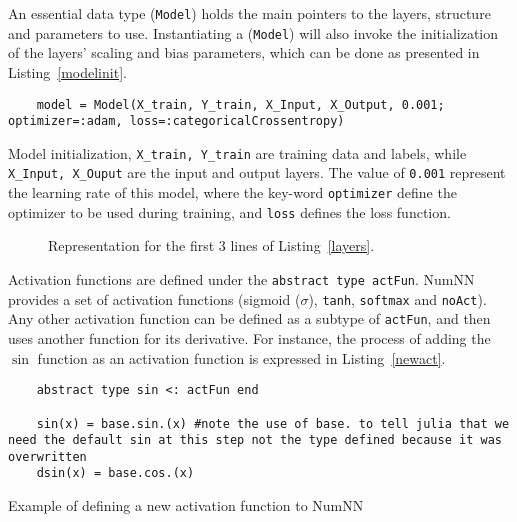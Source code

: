 An essential data type (\texttt{Model}) holds the main pointers to the layers, structure and parameters to use. Instantiating a (\texttt{Model}) will also invoke the initialization of the layers' scaling and bias parameters, which can be done as presented in Listing~\ref{modelinit}.

\begin{listing}[H]
	\begin{verbatim}
	model = Model(X_train, Y_train, X_Input, X_Output, 0.001; optimizer=:adam, loss=:categoricalCrossentropy)
	\end{verbatim}
	\caption{Model initialization, \texttt{X_train, Y_train} are training data and labels, while \texttt{X_Input, X_Ouput} are the input and output layers. The value of \texttt{0.001} represent the learning rate of this model, where the key-word \texttt{optimizer} define the optimizer to be used during training, and \texttt{loss} defines the loss function.}\label{modelinit}
\end{listing}



\begin{figure}[!h]
	\centering
	
	\caption{Representation for the first 3 lines of Listing~\ref{layers}.}\label{fig:inc}
\end{figure}

Activation functions are defined under the \texttt{abstract type actFun}. NumNN provides a set of activation functions (sigmoid ($\sigma$), \texttt{tanh}, \texttt{softmax} and \texttt{noAct}). Any other activation function can be defined as a subtype of \texttt{actFun}, and then uses another function for its derivative. For instance, the process of adding the $\sin$ function as an activation function is expressed in Listing~\ref{newact}.

\begin{listing}[!ht]
	\begin{verbatim}
	abstract type sin <: actFun end
	
	sin(x) = base.sin.(x) #note the use of base. to tell julia that we need the default sin at this step not the type defined because it was overwritten
	dsin(x) = base.cos.(x)
	\end{verbatim}
	\caption{Example of defining a new activation function to NumNN}\label{newact}
\end{listing}

